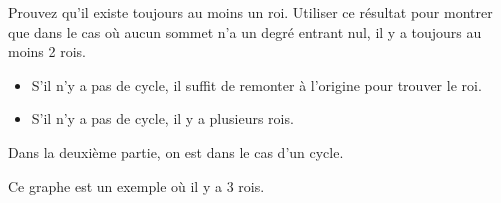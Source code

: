 Prouvez qu'il existe toujours au moins un roi.
Utiliser ce résultat pour montrer que dans le cas où aucun sommet n'a un degré entrant nul, il y a toujours au moins 2 rois.
\begin{solution}
\begin{itemize}
\item S'il n'y a pas de cycle, il suffit de remonter à l'origine pour trouver le roi.
\item S'il n'y a pas de cycle, il y a plusieurs rois.
\end{itemize}

Dans la deuxième partie, on est dans le cas d'un cycle.

Ce graphe est un exemple où il y a 3 rois.

\end{solution}
